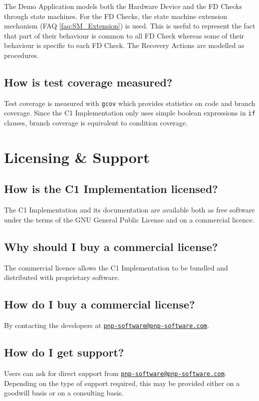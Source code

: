 \documentclass[faq]{../fwprofile}
\begin{document}
The Demo Application models both the Hardware Device and the FD Checks through state machines. For the FD Checks, the state machine extension mechanism (FAQ \ref{faq:SM_Extension}) is used. This is useful to represent the fact that part of their behaviour is common to all FD Check whereas some of their behaviour is specific to each FD Check. The Recovery Actions are modelled as procedures.


\subsection{How is test coverage measured?}
Test coverage is measured with \texttt{gcov} which provides statistics on code and branch coverage. Since the C1 Implementation only uses simple boolean 
expressions in \texttt{if} clauses, branch coverage is equivalent to condition coverage. 

\section{Licensing \& Support}\label{faq:licensing_issues}

\subsection{How is the C1 Implementation licensed?}
The C1 Implementation and its documentation are available both as free software under the terms of the GNU General Public License and on a commercial licence.

\subsection{Why should I buy a commercial license?}
The commercial licence allows the C1 Implementation to be bundled and distributed with proprietary software. 

\subsection{How do I buy a commercial license?}
By contacting the developers at \href{mailto:pnp-software@pnp-software.com}{\nolinkurl{pnp-software@pnp-software.com}}.

\subsection{How do I get support?}
Users can ask for direct support from \href{mailto:pnp-software@pnp-software.com}{\nolinkurl{pnp-software@pnp-software.com}}. Depending on the type of support required, this may be provided either on a goodwill basis or on a consulting basis.
\end{document}
